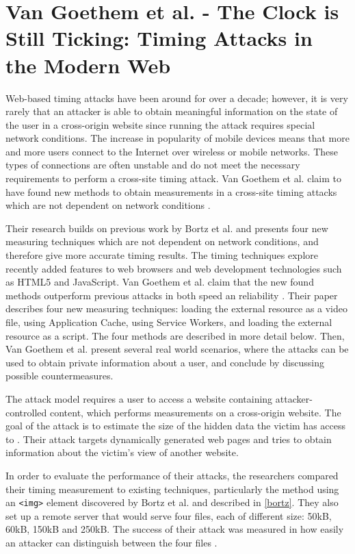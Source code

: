 \documentclass[10pt,a4paper,twoside]{book}
\begin{document}
\section{Van Goethem et al. - The Clock is Still Ticking: Timing Attacks in the Modern Web}

Web-based timing attacks have been around for over a decade; however, it is very rarely that an attacker is able to obtain meaningful information on the state of the user in a cross-origin website since running the attack requires special network conditions. The increase in popularity of mobile devices means that more and more users connect to the Internet over wireless or mobile networks. These types of connections are often unstable and do not meet the necessary requirements to perform a cross-site timing attack. Van Goethem et al. claim to have found new methods to obtain measurements in a cross-site timing attacks which are not dependent on network conditions \cite{van2015clock}.

Their research builds on previous work by Bortz et al.\cite{bortz2007exposing} and presents four new measuring techniques which are not dependent on network conditions, and therefore give more accurate timing results. The timing techniques explore recently added features to web browsers and web development technologies such as HTML5 and JavaScript. Van Goethem et al. claim that the new found methods outperform previous attacks in both speed an reliability \cite{van2015clock}. Their paper describes four new measuring techniques: loading the external resource as a video file, using Application Cache, using Service Workers, and loading the external resource as a script. The four methods are described in more detail below. Then, Van Goethem et al. \cite{van2015clock} present several real world scenarios, where the attacks can be used to obtain private information about a user, and conclude by discussing possible countermeasures.

The attack model requires a user to access a website containing attacker- controlled content, which performs measurements on a cross-origin website. The goal of the attack is to estimate the size of the hidden data the victim has access to \cite{van2015clock}. Their attack targets dynamically generated web pages and tries to obtain information about the victim's view of another website. 

In order to evaluate the performance of their attacks, the researchers compared their timing measurement to existing techniques, particularly the method using an \texttt{<img>} element discovered by Bortz et al. and described in \ref{bortz}. They also set up a remote server that would serve four files, each of different size: 50kB, 60kB, 150kB and 250kB. The success of their attack was measured in how easily an attacker can distinguish between the four files \cite{van2015clock}.
\end{document}
